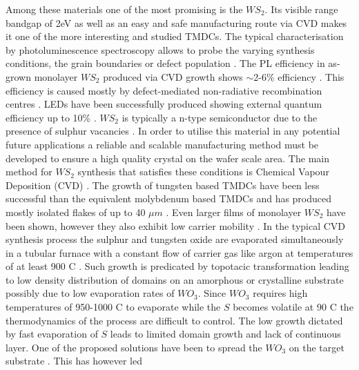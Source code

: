 \documentclass[12pt]{article}
\begin{document}
Among these materials one of the most promising is the $WS_2$. Its visible range bandgap of 2eV as well as an easy and safe manufacturing route via CVD makes it one of the more interesting and studied TMDCs. The typical characterisation by photoluminescence spectroscopy allows to probe the varying synthesis conditions, the grain boundaries or defect population \cite{ExtraordinaryRoomTemperaturePhotoluminescenceInTriangularWS2Monolayers} \cite{doi:10.1021/nn4046002} \cite{Li2015} \cite{Rong2014}. The PL efficiency in as-grown monolayer $WS_2$ produced via CVD growth shows {$\sim$}2-6\% efficiency \cite{doi:10.1021/nn4046002}\cite{Yuan2015} \cite{doi:10.1021/nn403682r}. This efficiency is caused mostly by defect-mediated non-radiative recombination centres \cite{Amani2015}. LEDs have been successfully produced \cite{doi:10.1021/nl500171v} showing external quantum efficiency up to 10\% \cite{Zeng2016}\cite{Withers2015}. $WS_2$ is typically a n-type semiconductor due to the presence of sulphur vacancies \cite{ExtraordinaryRoomTemperaturePhotoluminescenceInTriangularWS2Monolayers}\cite{doi:10.1021/nn5059908}\cite{Iqbal2015}. In order to utilise this material in any potential future applications a reliable and scalable manufacturing method must be developed to ensure a high quality crystal on the wafer scale area. The main method for $WS_2$ synthesis that satisfies these conditions is Chemical Vapour Deposition (CVD) \cite{Hofmann1988}. The growth of tungsten based TMDCs have been less successful than the equivalent molybdenum based TMDCs and has produced mostly isolated flakes of up to 40 $\mu m$ \cite{ExtraordinaryRoomTemperaturePhotoluminescenceInTriangularWS2Monolayers} \cite{doi:10.1021/nn403454e} \cite{Rong2014} \cite{doi:10.1021/nn400971k}\cite{doi:10.1021/acsnano.5b01480}\cite{Fu2015}\cite{Lee2013}. Even larger films of monolayer $WS_2$ have been shown, however they also exhibit low carrier mobility \cite{Kang2015}\cite{Gao2015}. In the typical CVD synthesis process the sulphur and tungsten oxide are evaporated simultaneously in a tubular furnace with a constant flow of carrier gas like argon at temperatures of at least 900 {\degree}C \cite{ExtraordinaryRoomTemperaturePhotoluminescenceInTriangularWS2Monolayers}\cite{doi:10.1021/nn403454e}\cite{Rong2014}\cite{doi:10.1021/nn400971k}\cite{doi:10.1021/acsnano.5b01480}\cite{Fu2015}\cite{Lee2013}. Such growth is predicated by topotacic transformation leading to low density distribution of domains on an amorphous \cite{ExtraordinaryRoomTemperaturePhotoluminescenceInTriangularWS2Monolayers}\cite{doi:10.1021/nn403454e}\cite{doi:10.1021/nn400971k}\cite{Fu2015}\cite{Lee2013} or crystalline substrate \cite{Rong2014}\cite{doi:10.1021/acsnano.5b01480}\cite{doi:10.1021/nn503093k} possibly due to low evaporation rates of $WO_3$. Since $WO_3$ requires high temperatures of 950-1000 {\degree}C to evaporate while the $S$ becomes volatile at 90 {\degree}C the thermodynamics of the process are difficult to control. The low growth dictated by fast evaporation of $S$ leads to limited domain growth and lack of continuous layer. One of the proposed solutions have been to spread the $WO_3$ on the target substrate \cite{doi:10.1021/nn4046002}\cite{Li2015}\cite{Gao2015}\cite{Cong2013}\cite{Yun2015}\cite{Gong2015}\cite{Gong2014}. This has however led 
\end{document}
